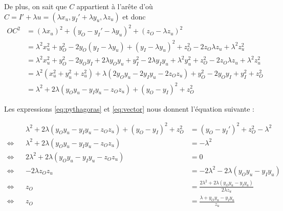 \documentclass{article}
\begin{document}
\begin{enumerate}
    De plus, on sait que $C$ appartient à l'arête d'où $C = I' + \lambda u = (\lambda x_u, y_I' + \lambda y_u, \lambda z_u)$ et donc 
    \begin{align}
        OC^2 &= (\lambda x_u)^2 + (y_O - y_I' - \lambda y_u)^2 + (z_O - \lambda z_u)^2 \nonumber\\
             &= \lambda^2x_u^2 + y_O^2 - 2y_O(y_I - \lambda y_u) + (y_I - \lambda y_u)^2 + z_O^2 - 2z_O\lambda z_u + \lambda^2z_u^2 \nonumber\\
             &= \lambda^2x_u^2 + y_O^2 - 2y_Oy_I + 2\lambda y_Oy_u + y_I^2 - 2\lambda y_Iy_u + \lambda^2y_u^2 + z_O^2 - 2z_O\lambda z_u + \lambda^2z_u^2 \nonumber\\
             &= \lambda^2(x_u^2 + y_u^2 + z_u^2) + \lambda(2y_Oy_u - 2y_Iy_u - 2z_Oz_u) + y_O^2 - 2y_Oy_I + y_I^2 + z_O^2 \nonumber\\
             &= \lambda^2 + 2\lambda(y_Oy_u - y_Iy_u - z_Oz_u) + (y_O - y_I)^2 + z_O^2 \label{eq:vector}
    \end{align}

    Les expressions \ref{eq:pythagoras} et \ref{eq:vector} nous donnent l'équation suivante :
    
    \begin{align}
        && \lambda^2 + 2\lambda(y_Oy_u - y_Iy_u - z_Oz_u) + (y_O - y_I)^2 + z_O^2 &= (y_O - y_I')^2 + z_O^2 - \lambda^2\nonumber\\
        \Leftrightarrow && \lambda^2 + 2\lambda(y_Oy_u - y_Iy_u - z_Oz_u) &= - \lambda^2 \nonumber\\
        \Leftrightarrow && 2\lambda^2 + 2\lambda(y_Oy_u - y_Iy_u - z_Oz_u) &= 0 \nonumber\\
        \Leftrightarrow &&  -2\lambda z_Oz_u &= -2\lambda^2 - 2\lambda(y_Oy_u - y_Iy_u)\nonumber\\
        \Leftrightarrow &&  z_O &= \frac{2\lambda^2 + 2\lambda(y_Oy_u - y_Iy_u)}{2\lambda z_u}\nonumber\\
        \Leftrightarrow &&  z_O &= \frac{\lambda + y_Oy_u - y_Iy_u}{z_u}\label{eq:z_O_tmp}
    \end{align}


\end{enumerate}
\end{document}
